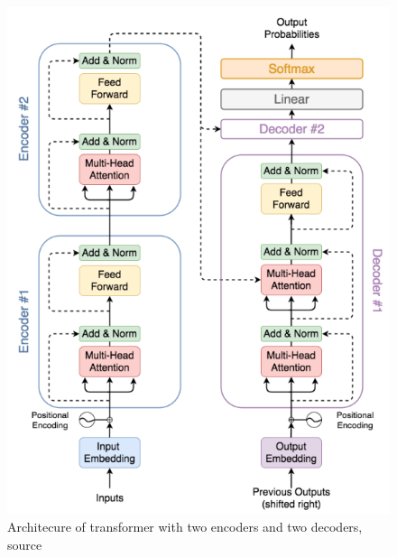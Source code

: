 \begin{figure}
    \centering
    \includegraphics[width=\linewidth]{images/two_layer_transformer.png}
    \caption{Architecure of transformer with two encoders and two decoders, source \cite{Yin2020}}
    \label{fig:nlp_transformer}
\end{figure}

